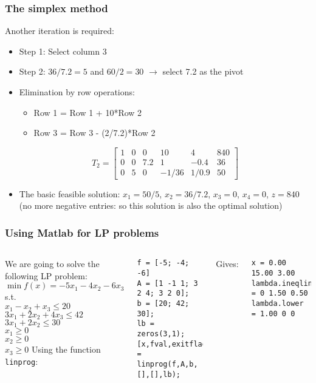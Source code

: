 \begin{frame}
  \frametitle{The simplex method}
  Another iteration is required:
  \begin{itemize}
    \item Step 1: Select column 3
    \item Step 2: $36/7.2 = 5$ and $60/2 = 30$ $\longrightarrow$ select 7.2 as the pivot
    \item Elimination by row operations:
    \begin{itemize}
      \item Row 1 = Row 1 + 10*Row 2
      \item Row 3 = Row 3 - (2/7.2)*Row 2
    \end{itemize}
       \[
T_2 = \begin{bmatrix}
1 & 0 & 0 & 10 & 4 & 840\\ 
0 & 0 & 7.2 & 1 & -0.4 & 36\\
0 & 5 & 0 & -1/36 & 1/0.9 &50 
\end{bmatrix}
   \]
    \item The basic feasible solution: $x_1 = 50/5$, $x_2 = 36/7.2$, $x_3 = 0$, $x_4 = 0$, $z=840$ (no more negative entries: so this solution is also the optimal solution)
  \end{itemize}
\end{frame}

\begin{frame}[fragile]
  \frametitle{Using Matlab for LP problems}
  \begin{columns}
    We are going to solve the following LP problem:\\
    $\min f(x) = -5x_1 -4x_2 - 6x_3$ \\
    s.t. \\
    $x_1 - x_2 + x_3 \leq 20$ \\
    $3x_1 + 2x_2 + 4x_3 \leq 42$ \\
    $3x_1 + 2x_2 \leq 30$ \\
    $x_1 \geq 0$ \\
    $x_2 \geq 0$ \\
    $x_3 \geq 0$
    Using the function \lstinline$linprog$:
    \begin{lstlisting}
f = [-5; -4; -6]
A = [1 -1 1; 3 2 4; 3 2 0];
b = [20; 42; 30];
lb = zeros(3,1);
[x,fval,exitflag,output,lambda]
= linprog(f,A,b,[],[],lb);
    \end{lstlisting}
Gives:
    \begin{lstlisting}
x = 0.00 15.00 3.00
lambda.ineqlin = 0 1.50 0.50
lambda.lower = 1.00 0 0
    \end{lstlisting}
  \end{columns}
\end{frame}

